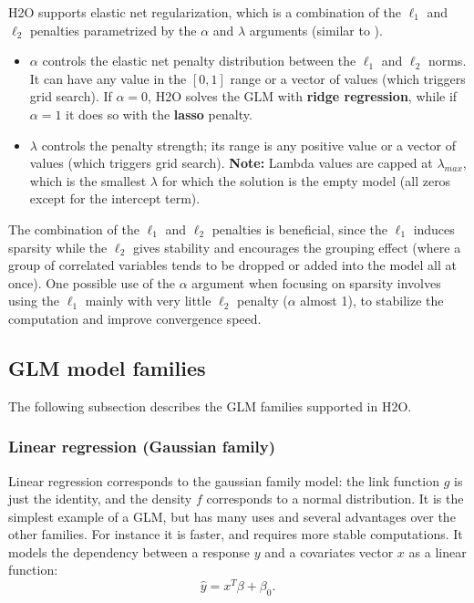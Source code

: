 H2O supports elastic net regularization, which is a combination of the $\ell_1$ and $\ell_2$ penalties parametrized by the $\alpha$ and $\lambda$ arguments (similar to ).
\begin{itemize}
\item $\alpha$ controls the elastic net penalty distribution between the $\ell_1$ and $\ell_2$ norms. It can have any value
in the $[0,1]$ range or a vector of values (which triggers grid search). If $\alpha = 0$, H2O solves the GLM with \textbf{ridge regression}, while if $\alpha = 1$ it does so with the \textbf{lasso} penalty.
\item $\lambda$ controls the penalty strength; its range is any positive value or a vector of values (which triggers grid search). 
\textbf{Note:} Lambda values are capped at $\lambda_{max}$, which is the smallest $\lambda$ for which the solution is
the empty model (all zeros except for the intercept term). %
\end{itemize}


The combination of the $\ell_1$ and $\ell_2$ penalties is beneficial, since the $\ell_1$ induces sparsity while the $\ell_2$ gives
stability and encourages the grouping effect (where a group of correlated variables tends to be dropped or added
into the model all at once). One possible use of the $\alpha$ argument when focusing on sparsity involves using the $\ell_1$ mainly with very little $\ell_2$ penalty
($\alpha$ almost 1), to stabilize the computation and improve convergence speed.


\subsection{GLM model families}
The following subsection describes the GLM families supported in H2O. 

\subsubsection{Linear regression (Gaussian family)}
Linear regression corresponds to the gaussian family model: the link function $g$ is just the identity, and the density $f$ corresponds to a normal distribution. It is the simplest example of a GLM, but has many uses and
several advantages over the other families. For instance it is faster, and requires more stable computations. It models the dependency between a response $y$ and a covariates vector $x$ as a linear function:
$$ \hat{y} = x^T\beta + \beta_0.$$

